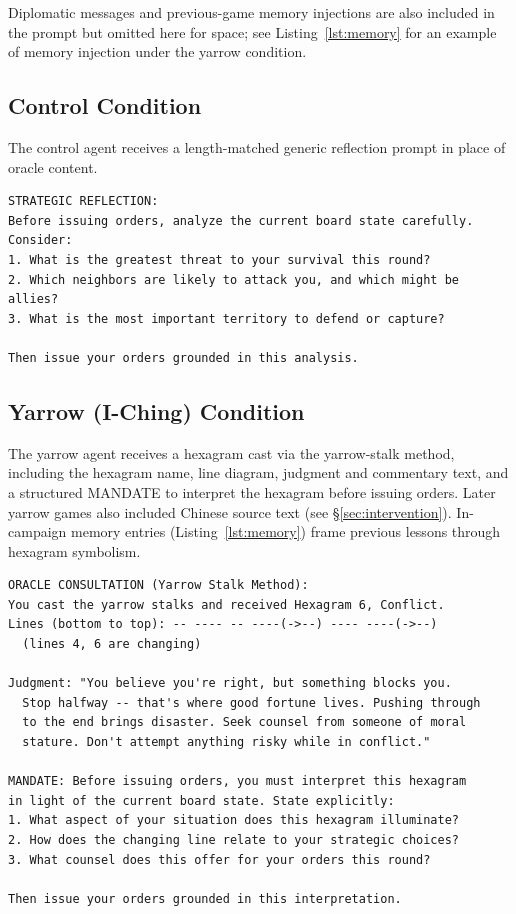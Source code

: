 \documentclass[11pt]{article}
\begin{document}
Diplomatic messages and previous-game memory injections are also
included in the prompt but omitted here for space; see
Listing~\ref{lst:memory} for an example of memory injection under the
yarrow condition.

\subsection{Control Condition}
\label{app:control}

The control agent receives a length-matched generic reflection prompt
in place of oracle content.

\begin{lstlisting}[caption={Control condition injection (game \texttt{control\_8c67}).},label={lst:control}]
STRATEGIC REFLECTION:
Before issuing orders, analyze the current board state carefully.
Consider:
1. What is the greatest threat to your survival this round?
2. Which neighbors are likely to attack you, and which might be allies?
3. What is the most important territory to defend or capture?

Then issue your orders grounded in this analysis.
\end{lstlisting}

\subsection{Yarrow (I-Ching) Condition}
\label{app:yarrow}

The yarrow agent receives a hexagram cast via the yarrow-stalk
method, including the hexagram name, line diagram, judgment and
commentary text, and a structured \textsc{MANDATE} to interpret the
hexagram before issuing orders.  Later yarrow games also included
Chinese source text (see \S\ref{sec:intervention}).  In-campaign memory entries
(Listing~\ref{lst:memory}) frame previous lessons through hexagram
symbolism.

\begin{lstlisting}[caption={Yarrow condition injection (game \texttt{random\_oracle\_3c96}, Hexagram 6).},label={lst:yarrow}]
ORACLE CONSULTATION (Yarrow Stalk Method):
You cast the yarrow stalks and received Hexagram 6, Conflict.
Lines (bottom to top): -- ---- -- ----(->--) ---- ----(->--)
  (lines 4, 6 are changing)

Judgment: "You believe you're right, but something blocks you.
  Stop halfway -- that's where good fortune lives. Pushing through
  to the end brings disaster. Seek counsel from someone of moral
  stature. Don't attempt anything risky while in conflict."

MANDATE: Before issuing orders, you must interpret this hexagram
in light of the current board state. State explicitly:
1. What aspect of your situation does this hexagram illuminate?
2. How does the changing line relate to your strategic choices?
3. What counsel does this offer for your orders this round?

Then issue your orders grounded in this interpretation.
\end{lstlisting}
\end{document}
